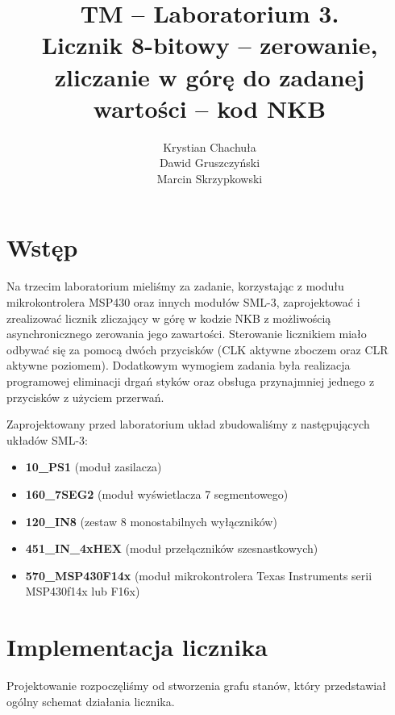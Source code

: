 \documentclass[fleqn]{article}
\title{TM -- Laboratorium 3. \\ \large Licznik 8-bitowy – zerowanie, zliczanie w górę do zadanej wartości – kod NKB}
\author{Krystian Chachuła \\ Dawid Gruszczyński \\ Marcin Skrzypkowski}
\begin{document}
\maketitle

\setcounter{page}{0}
\thispagestyle{empty}

\pagebreak

\setcounter{page}{1}

\section{Wstęp}

Na trzecim laboratorium mieliśmy za zadanie, korzystając z modułu mikrokontrolera MSP430 oraz innych modułów SML-3, zaprojektować i zrealizować licznik zliczający w górę w kodzie NKB z możliwością asynchronicznego zerowania jego zawartości.
Sterowanie licznikiem miało odbywać się za pomocą dwóch przycisków (CLK aktywne zboczem oraz CLR aktywne poziomem).
Dodatkowym wymogiem zadania była realizacja programowej eliminacji drgań styków oraz obsługa przynajmniej jednego z przycisków z użyciem przerwań.

Zaprojektowany przed laboratorium układ zbudowaliśmy z następujących układów SML-3:

\begin{itemize}
	\item \textbf{10\_PS1} (moduł zasilacza)
	\item \textbf{160\_7SEG2} (moduł wyświetlacza 7 segmentowego)
	\item \textbf{120\_IN8} (zestaw 8 monostabilnych wyłączników)
	\item \textbf{451\_IN\_4xHEX} (moduł przełączników szesnastkowych)
	\item \textbf{570\_MSP430F14x} (moduł mikrokontrolera Texas Instruments serii MSP430f14x lub F16x)
\end{itemize}

\section{Implementacja licznika}

Projektowanie rozpoczęliśmy od stworzenia grafu stanów, który przedstawiał ogólny schemat działania licznika.
\end{document}
